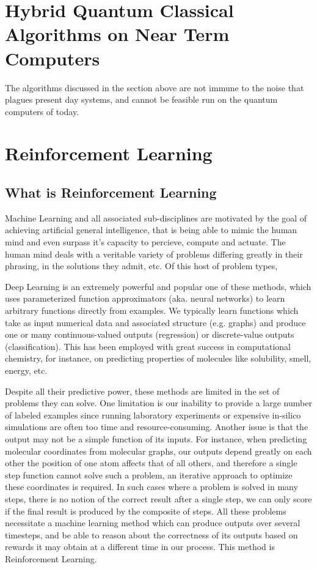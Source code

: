 \section{Hybrid Quantum Classical Algorithms on Near Term Computers}

The algorithms discussed in the section above are not immune to the noise that plagues present day systems, and cannot be feasible run on the quantum computers of today. 


\section{Reinforcement Learning}

\subsection{What is Reinforcement Learning}

Machine Learning and all associated sub-disciplines are motivated by the goal of achieving artificial general intelligence, that is being able to mimic the human mind and even surpass it's capacity to percieve, compute and actuate. The human mind deals with a veritable variety of problems differing greatly in their phrasing, in the solutions they admit, etc. Of this host of problem types, 

Deep Learning is an extremely powerful and popular one of these methods, which uses parameterized function approximators (aka. neural networks) to learn arbitrary functions directly from examples. We typically learn functions which take as input numerical data and associated structure (e.g. graphs) and produce one or many continuous-valued outputs (regression) or discrete-value outputs (classification). This has been employed with great success in computational chemistry, for instance, on predicting properties of molecules like solubility, smell, energy, etc. %

Despite all their predictive power, these methods are limited in the set of problems they can solve. One limitation is our inability to provide a large number of labeled examples since running laboratory experiments or expensive in-silico simulations are often too time and resource-consuming. Another issue is that the output may not be a simple function of its inputs. For instance, when predicting molecular coordinates from molecular graphs, our outputs depend greatly on each other the position of one atom affects that of all others, and therefore a single step function cannot solve such a problem, an iterative approach to optimize these coordinates is required. In such cases where a problem is solved in many steps, there is no notion of the correct result after a single step, we can only score if the final result is produced by the composite of steps. All these problems necessitate a machine learning method which can produce outputs over several timesteps, and be able to reason about the correctness of its outputs based on rewards it may obtain at a different time in our process. This method is Reinforcement Learning. \cite{rl-intro-sutton-barto}


